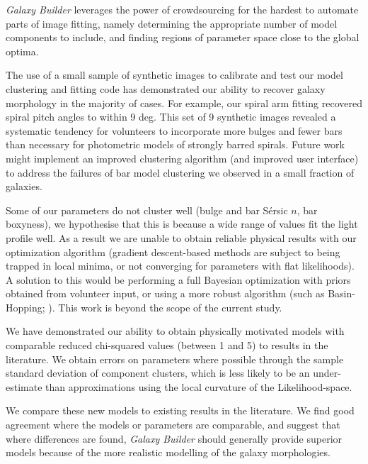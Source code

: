\documentclass[trackchanges]{aastex63}
\begin{document}
\textit{Galaxy Builder} leverages the power of crowdsourcing for the hardest to automate parts of image fitting, namely determining the appropriate number of model components to include, and finding regions of parameter space close to the global optima.

The use of a small sample of synthetic images to calibrate and test our model clustering and fitting code has demonstrated our ability to recover galaxy morphology in the majority of cases. For example, our spiral arm fitting recovered spiral pitch angles to within 9 deg. This set of 9 synthetic images revealed a systematic tendency for volunteers to incorporate more bulges and fewer bars than necessary for photometric models of strongly barred spirals. Future work might implement an improved clustering algorithm (and improved user interface) to address the failures of bar model clustering we observed in a small fraction of galaxies.

Some of our parameters do not cluster well (bulge and bar S\'ersic $n$, bar boxyness), we hypothesise that this is because a wide range of values fit the light profile well. As a result we are unable to obtain reliable physical results with our optimization algorithm (gradient descent-based methods are subject to being trapped in local minima, or not converging for parameters with flat likelihoods). A solution to this would be performing a full Bayesian optimization with priors obtained from volunteer input, or using a more robust algorithm (such as Basin-Hopping; \citealt{1998cond.mat..3344W}). This work is beyond the scope of the current study.

We have demonstrated our ability to obtain physically motivated models with comparable reduced chi-squared values (between 1 and 5) to results in the literature. We obtain errors on parameters where possible through the sample standard deviation of component clusters, which is less likely to be an under-estimate than approximations using the local curvature of the Likelihood-space.

We compare these new models to existing results in the literature. We find good agreement where the models or parameters are comparable, and suggest that where differences are found, \textit{Galaxy Builder} should generally provide superior models because of the more realistic modelling of the galaxy morphologies.

\end{document}
